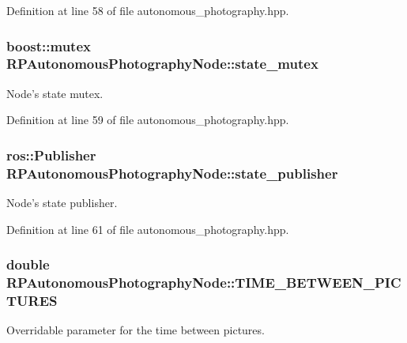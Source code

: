 \-Definition at line 58 of file autonomous\-\_\-photography.\-hpp.

\hypertarget{class_r_p_autonomous_photography_node_af419f69958f392bea348dbd05bc8d401}{
\subsubsection[{state\-\_\-mutex}]{\setlength{\rightskip}{0pt plus 5cm}boost\-::mutex {\bf \-R\-P\-Autonomous\-Photography\-Node\-::state\-\_\-mutex}}}\label{class_r_p_autonomous_photography_node_af419f69958f392bea348dbd05bc8d401}
\-Node's state mutex. 

\-Definition at line 59 of file autonomous\-\_\-photography.\-hpp.

\hypertarget{class_r_p_autonomous_photography_node_a562382a07e7c13dd0386e310979f54a5}{
\subsubsection[{state\-\_\-publisher}]{\setlength{\rightskip}{0pt plus 5cm}ros\-::\-Publisher {\bf \-R\-P\-Autonomous\-Photography\-Node\-::state\-\_\-publisher}}}\label{class_r_p_autonomous_photography_node_a562382a07e7c13dd0386e310979f54a5}
\-Node's state publisher. 

\-Definition at line 61 of file autonomous\-\_\-photography.\-hpp.

\hypertarget{class_r_p_autonomous_photography_node_a707507f69bb3d4d5ea065fef6a611f56}{
\subsubsection[{\-T\-I\-M\-E\-\_\-\-B\-E\-T\-W\-E\-E\-N\-\_\-\-P\-I\-C\-T\-U\-R\-E\-S}]{\setlength{\rightskip}{0pt plus 5cm}double {\bf \-R\-P\-Autonomous\-Photography\-Node\-::\-T\-I\-M\-E\-\_\-\-B\-E\-T\-W\-E\-E\-N\-\_\-\-P\-I\-C\-T\-U\-R\-E\-S}}}\label{class_r_p_autonomous_photography_node_a707507f69bb3d4d5ea065fef6a611f56}
\-Overridable parameter for the time between pictures. 

